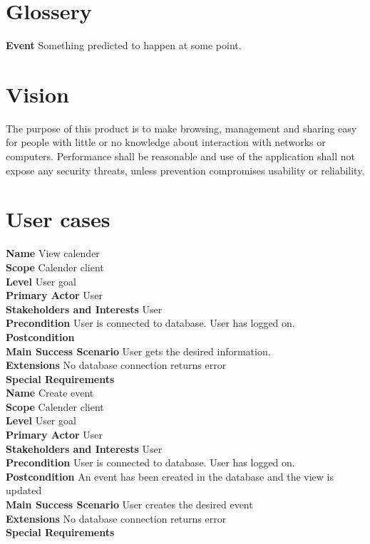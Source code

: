 \documentclass[a4paper,10pt,titlepage]{article}
\begin{document}
\section{Glossery}
	\textbf{Event}
	Something predicted to happen at some point.
	
\section{Vision}
	The purpose of this product is to make browsing, management and sharing easy for people with little or no knowledge about interaction with networks or computers. Performance shall be reasonable and use of the application shall not expose any security threats, unless prevention compromises usability or reliability.
	
\section{User cases}
	\textbf{Name}
	View calender
	\\
	\textbf{Scope}
	Calender client
	\\
	\textbf{Level}
	User goal
	\\
	\textbf{Primary Actor}
	User
	\\
	\textbf{Stakeholders and Interests}
	User
	\\
	\textbf{Precondition}
	User is connected to database.
	 User has logged on.
	\\
	\textbf{Postcondition}
	\\
	\textbf{Main Success Scenario}
	User gets the desired information.
	\\
	\textbf{Extensions}
	No database connection returns error
	\\
	\textbf{Special Requirements}
	\\
	
	\textbf{Name}
	Create event
	\\
	\textbf{Scope}
	Calender client
	\\
	\textbf{Level}
	User goal
	\\
	\textbf{Primary Actor}
	User
	\\
	\textbf{Stakeholders and Interests}
	User
	\\
	\textbf{Precondition}
	User is connected to database.
	User has logged on.
	\\
	\textbf{Postcondition}
	An event has been created in the database and the view is updated
	\\
	\textbf{Main Success Scenario}
	User creates the desired event
	\\
	\textbf{Extensions}
	No database connection returns error
	\\
	\textbf{Special Requirements}
	\\
	
\end{document}
